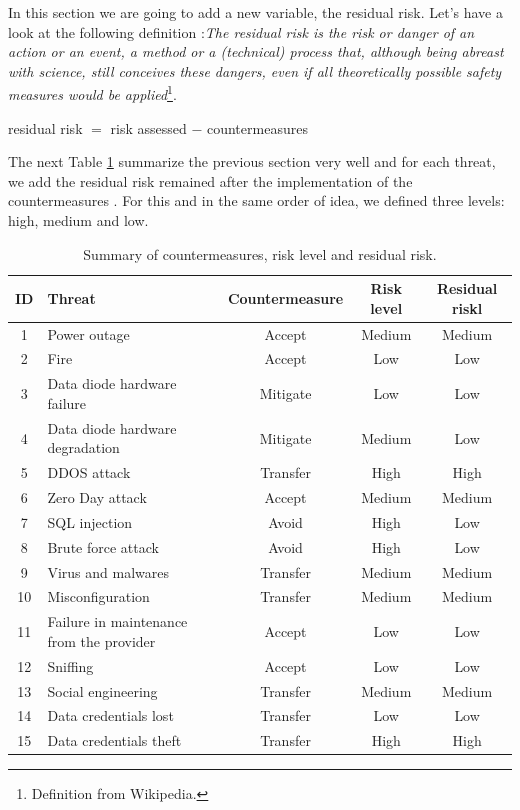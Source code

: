 \documentclass[a4paper,10pt]{article}
\begin{document}
In this section we are going to add a new variable, the residual risk. Let's have a look at the following definition :\emph{The residual risk is the risk or danger of an action or an event, a method or a (technical) process that, although being abreast with science, still conceives these dangers, even if all theoretically possible safety measures would be applied}\footnote{Definition from Wikipedia.}.
\begin{center}
residual risk $=$ risk assessed $-$ countermeasures
\end{center}

The next Table \ref{tab:riskresid} summarize the previous section very well and for each threat, we add the residual risk remained after the implementation of the countermeasures . For this and in the same order of idea, we defined three levels: high, medium and low.
\begin{table}[!h]
	\centering
\begin{tabular}{|c|p{4cm}|c|c|c|}
	\hline
	\textbf{ID}& \textbf{Threat}  & \textbf{Countermeasure} & \textbf{Risk level} & \textbf{Residual riskl}          \\
	\hline
	1 & Power outage & Accept & Medium & Medium \\
	\hline
	2 & Fire  & Accept & Low & Low \\
	\hline
	3 & Data diode hardware failure & Mitigate & Low & Low \\
	\hline
	4 & Data diode hardware degradation & Mitigate & Medium & Low  \\
	\hline
	5 & DDOS attack & Transfer & High & High \\
	\hline
	6 & Zero Day attack & Accept & Medium & Medium \\
	\hline
	7 &  SQL injection & Avoid & High & Low \\
	\hline
	8 & Brute force attack & Avoid & High & Low \\
	\hline
	9 & Virus and malwares & Transfer & Medium & Medium \\
	\hline
	10 & Misconfiguration & Transfer & Medium & Medium \\
	\hline
	11 & Failure in maintenance from the provider & Accept & Low & Low \\
	\hline
	12 & Sniffing & Accept & Low & Low \\
	\hline
	13 & Social engineering & Transfer & Medium & Medium \\
	\hline
	14 & Data credentials lost & Transfer & Low & Low \\
	\hline
	15 & Data credentials theft & Transfer & High & High \\
	\hline
	\end{tabular}
	\caption{Summary of countermeasures, risk level and residual risk.}
	\label{tab:riskresid}

\end{table}
\end{document}
